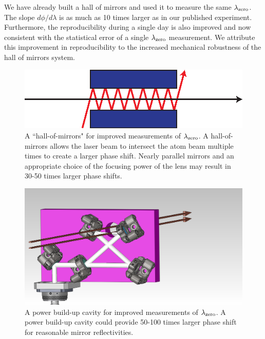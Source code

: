 We have already built a hall of mirrors and used it to measure the same $\lambdaZero$. The slope $d\phi/d\lambda$ is as much as 10 times larger as in our published experiment. Furthermore, the reproducibility during a single day is also improved and now consistent with the statistical error of a single $\lambdaZero$ measurement. We attribute this improvement in reproducibility to the increased mechanical robustness of the hall of mirrors system.

\begin{figure}
\centerline{\includegraphics[width=.90\textwidth]{Figures/HOM.eps}}
\caption[A hall-of-mirrors for improved measurements of $\lambdaZero$.]{\label{mzwHOM}A ``hall-of-mirrors" for improved measurements of $\lambdaZero$. A hall-of-mirrors allows the laser beam to intersect the atom beam multiple times to create a larger phase shift. Nearly parallel mirrors and an appropriate choice of the focusing power of the lens may result in 30-50 times larger phase shifts.}
\end{figure}

\begin{figure}
\centerline{\includegraphics[width=.90\textwidth]{Figures/mzwCavityThruHole2.jpg}}
\caption[A power build-up cavity for improved measurements of $\lambdaZero$.]{\label{mzwCavityFig}A power build-up cavity for improved measurements of $\lambdaZero$. A power build-up cavity could provide 50-100 times larger phase shift for reasonable mirror reflectivities.}
\end{figure}

